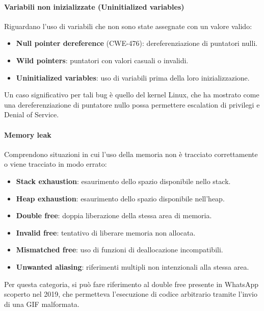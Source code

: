 \paragraph{Variabili non inizializzate (Uninitialized variables)}
\label{sec:uninitialized}

Riguardano l'uso di variabili che non sono state assegnate con un valore valido:
\begin{itemize}
  \item \textbf{Null pointer dereference} (CWE-476): dereferenziazione di puntatori
    nulli.

  \item \textbf{Wild pointers}: puntatori con valori casuali o invalidi.

  \item \textbf{Uninitialized variables}: uso di variabili prima della loro inizializzazione.
\end{itemize}
Un caso significativo per tali bug è quello del kernel Linux\cite{null_pointer_dereference_linux},
che ha mostrato come una dereferenziazione di puntatore nullo possa permettere escalation
di privilegi e Denial of Service.

\paragraph{Memory leak}
\label{sec:memory_leaks}

Comprendono situazioni in cui l'uso della memoria non è tracciato correttamente o
viene tracciato in modo errato:
\begin{itemize}
  \item \textbf{Stack exhaustion}: esaurimento dello spazio disponibile nello stack.

  \item \textbf{Heap exhaustion}: esaurimento dello spazio disponibile nell'heap.

  \item \textbf{Double free}: doppia liberazione della stessa area di memoria.

  \item \textbf{Invalid free}: tentativo di liberare memoria non allocata.

  \item \textbf{Mismatched free}: uso di funzioni di deallocazione incompatibili.

  \item \textbf{Unwanted aliasing}: riferimenti multipli non intenzionali alla stessa
    area.
\end{itemize}
Per questa categoria, si può fare riferimento al double free presente in WhatsApp
scoperto nel 2019\cite{whatsapp_double_free}, che permetteva l'esecuzione di codice
arbitrario tramite l'invio di una GIF malformata.

